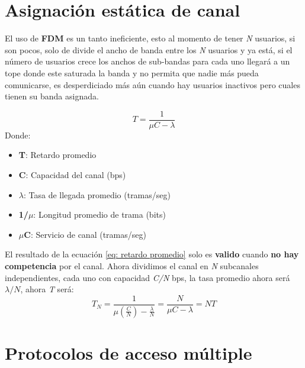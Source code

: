 \documentclass[
	12pt, %
	fleqn, %
	a4paper, %
	oneside, %
]{LegrandOrangeBook}
\begin{document}
\section{Asignación estática de canal}
El uso de \textbf{FDM} es un tanto ineficiente, esto al momento de tener \textit{N} usuarios, si son pocos, solo de divide el ancho de banda entre los \textit{N} usuarios y ya está, si el número de usuarios crece los anchos de sub-bandas para cada uno llegará a un tope donde este saturada la banda y no permita que nadie más pueda comunicarse, es desperdiciado más aún cuando hay usuarios inactivos pero cuales tienen su banda asignada.
\begin{definition}
\begin{equation}
T=\frac{1}{\mu C - \lambda}
\label{eq: retardo promedio}
\end{equation}
Donde:
\begin{itemize}
\item \textbf{T}: Retardo promedio
\item \textbf{C}: Capacidad del canal (bps)
\item \textbf{$\lambda$}: Tasa de llegada promedio (tramas/seg)
\item \textbf{1/$\mu$}: Longitud promedio de trama (bits)
\item \textbf{$\mu$C}: Servicio de canal (tramas/seg)
\end{itemize}
El resultado de la ecuación \ref{eq: retardo promedio} solo es \textbf{valido} cuando \textbf{no hay competencia} por el canal. Ahora dividimos el canal en  \textit{N} subcanales independientes, cada uno con capacidad \textit{C/N} bps, la tasa promedio ahora será $\lambda/N$, ahora \textit{T} será:
\begin{equation}
T_N=\frac{1}{\mu(\frac{C}{N})-\frac{\lambda}{N}}=\frac{N}{\mu C-\lambda}=NT
\end{equation}
\end{definition}
\section{Protocolos de acceso múltiple}
\end{document}
